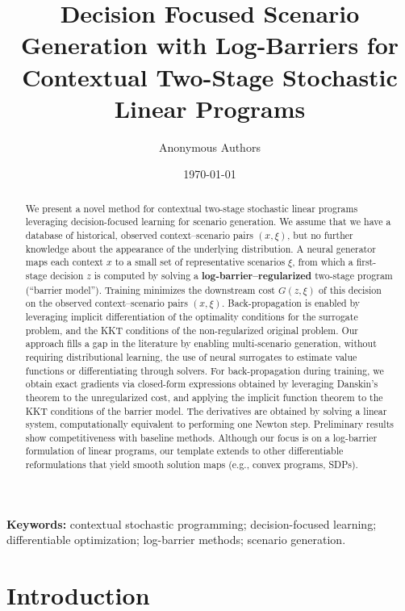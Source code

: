 \documentclass{article}
\title{Decision Focused Scenario Generation with Log-Barriers for Contextual Two-Stage Stochastic Linear Programs}
\author{Anonymous Authors}
\date{\today}
\begin{document}
\maketitle

\begin{abstract}
We present a novel method for contextual two-stage stochastic linear programs leveraging decision-focused learning for scenario generation. 
We assume that we have a database of historical, observed context–scenario pairs $(x,\xi)$, but no further knowledge about the appearance of the underlying distribution. 
A neural generator maps each context $x$ to a small set of representative scenarios $\xi$, from which a first-stage decision $z$ is computed by solving a \textbf{log-barrier–regularized} two-stage program (“barrier model”). 
Training minimizes the downstream cost $G(z,\xi)$ of this decision on the observed context–scenario pairs $(x,\xi)$. 
Back-propagation is enabled by leveraging implicit differentiation of the optimality conditions for the surrogate problem, and the KKT conditions of the non-regularized original problem.
Our approach fills a gap in the literature by enabling multi-scenario generation, without requiring distributional learning, the use of neural surrogates to estimate value functions or differentiating through solvers.
For back-propagation during training, we obtain exact gradients via closed-form expressions obtained by leveraging Danskin's theorem to the unregularized cost, and applying the implicit function theorem to the KKT conditions of the barrier model.
The derivatives are obtained by solving a linear system, computationally equivalent to performing one Newton step.
Preliminary results show competitiveness with baseline methods.
Although our focus is on a log-barrier formulation of linear programs, our template extends to other differentiable reformulations that yield smooth solution maps (e.g., convex programs, SDPs).
\end{abstract}

\noindent\textbf{Keywords:} contextual stochastic programming; decision-focused learning; differentiable optimization; log-barrier methods; scenario generation.


\section{Introduction}
\end{document}
